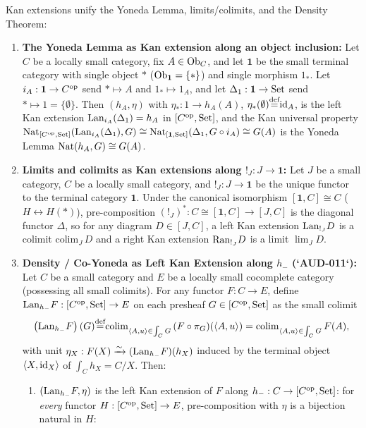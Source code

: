 \documentclass[10pt,a4paper]{article}
\begin{document}
\begin{theorem}\label{thm:kan_unification}
Kan extensions unify the Yoneda Lemma, limits/colimits, and the Density Theorem:
\begin{enumerate}
\item \textbf{The Yoneda Lemma as Kan extension along an object inclusion:} Let $C$ be a locally small category, fix $A \in {\textrm{Ob}}_C$, and let $\mathbf{1}$ be the small terminal category with single object $*$ (${\textrm{Ob}}_{\mathbf{1}} = \{*\}$) and single morphism $1_*$. Let $i_A : \mathbf{1} \to C^{\textrm{op}}$ send $* \mapsto A$ and $1_* \mapsto 1_A$, and let $\Delta_1 : \mathbf{1} \to {\textrm{Set}}$ send $* \mapsto 1 = \{\emptyset\}$. Then $(h_A, \eta)$ with $\eta_* : 1 \to h_A(A)$, $\eta_*(\emptyset) {\stackrel{{\textrm{def}}}{=}} {\textrm{id}}_A$, is the left Kan extension ${\mathrm{Lan}}_{i_A}(\Delta_1) = h_A$ in $[C^{\textrm{op}}, {\textrm{Set}}]$, and the Kan universal property ${\textrm{Nat}}_{[C^{\textrm{op}},{\textrm{Set}}]}({\mathrm{Lan}}_{i_A}(\Delta_1), G) \cong {\textrm{Nat}}_{[\mathbf{1},{\textrm{Set}}]}(\Delta_1, G \circ i_A) \cong G(A)$ is the Yoneda Lemma ${\textrm{Nat}}(h_A, G) \cong G(A)$.
\item \textbf{Limits and colimits as Kan extensions along $!_J : J \to \mathbf{1}$:} Let $J$ be a small category, $C$ be a locally small category, and $!_J : J \to \mathbf{1}$ be the unique functor to the terminal category $\mathbf{1}$. Under the canonical isomorphism $[\mathbf{1}, C] \cong C$ ($H \leftrightarrow H(*)$), pre-composition $(!_J)^* : C \cong [\mathbf{1}, C] \to [J, C]$ is the diagonal functor $\Delta$, so for any diagram $D \in [J, C]$, a left Kan extension ${\mathrm{Lan}}_{!_J} D$ is a colimit $\mathrm{colim}_J\, D$ and a right Kan extension ${\mathrm{Ran}}_{!_J} D$ is a limit $\lim_J D$.
\item \textbf{Density / Co-Yoneda as Left Kan Extension along $h_-$ (`AUD-011`):} Let $C$ be a small category and $E$ be a locally small cocomplete category (possessing all small colimits). For any functor $F : C \to E$, define ${\mathrm{Lan}}_{h_-} F : [C^{\textrm{op}}, {\textrm{Set}}] \to E$ on each presheaf $G \in [C^{\textrm{op}}, {\textrm{Set}}]$ as the small colimit
$$\left({\mathrm{Lan}}_{h_-} F\right)(G) {\stackrel{{\textrm{def}}}{=}} \mathrm{colim}_{\langle A, u \rangle \in \int_C G}\, (F \circ \pi_G)(\langle A, u \rangle) = \mathrm{colim}_{\langle A, u \rangle \in \int_C G}\, F(A),$$
with unit $\eta_X : F(X) \xrightarrow{\sim} ({\mathrm{Lan}}_{h_-} F)(h_X)$ induced by the terminal object $\langle X, {\textrm{id}}_X \rangle$ of $\int_C h_X = C / X$. Then:
  \begin{enumerate}
  \item[(a)] $({\mathrm{Lan}}_{h_-} F, \eta)$ is the left Kan extension of $F$ along $h_- : C \to [C^{\textrm{op}}, {\textrm{Set}}]$: for \emph{every} functor $H : [C^{\textrm{op}}, {\textrm{Set}}] \to E$, pre-composition with $\eta$ is a bijection natural in $H$:

\end{enumerate}
\end{enumerate}
\end{theorem}
\end{document}
